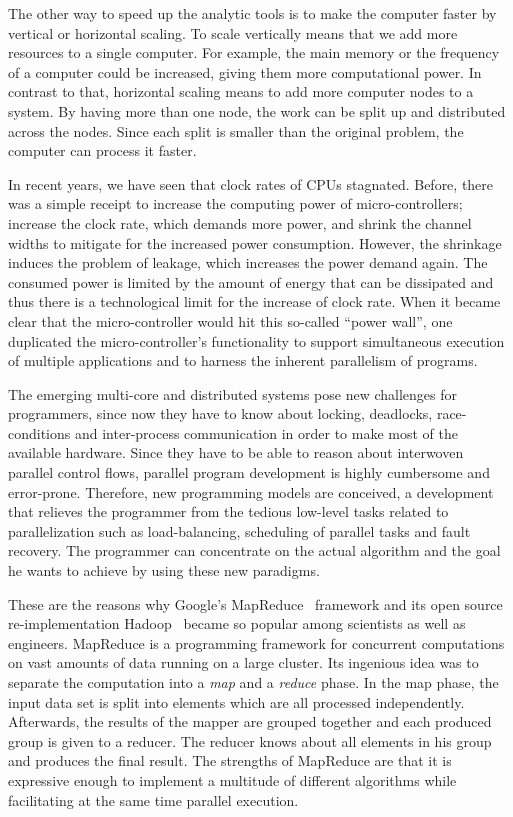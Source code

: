The other way to speed up the analytic tools is to make the computer faster by vertical or horizontal scaling.
To scale vertically means that we add more resources to a single computer.
For example, the main memory or the frequency of a computer could be increased, giving them more computational power.
In contrast to that, horizontal scaling means to add more computer nodes to a system.
By having more than one node, the work can be split up and distributed across the nodes.
Since each split is smaller than the original problem, the computer can process it faster.

In recent years, we have seen that clock rates of CPUs stagnated.
Before, there was a simple receipt to increase the computing power of micro-controllers; increase the clock rate, which demands more power, and shrink the channel widths to mitigate for the increased power consumption.
However, the shrinkage induces the problem of leakage, which increases the power demand again.
The consumed power is limited by the amount of energy that can be dissipated and thus there is a technological limit for the increase of clock rate.
When it became clear that the micro-controller would hit this so-called ``power wall'', one duplicated the micro-controller's functionality to support simultaneous execution of multiple applications and to harness the inherent parallelism of programs.

The emerging multi-core and distributed systems pose new challenges for programmers, since now they have to know about locking, deadlocks, race-conditions and inter-process communication in order to make most of the available hardware.
Since they have to be able to reason about interwoven parallel control flows, parallel program development is highly cumbersome and error-prone.
Therefore, new programming models are conceived, a development that relieves the programmer from the tedious low-level tasks related to parallelization such as load-balancing, scheduling of parallel tasks and fault recovery.
The programmer can concentrate on the actual algorithm and the goal he wants to achieve by using these new paradigms.

These are the reasons why Google's MapReduce~\cite{dean:c2008a} framework and its open source re-implementation Hadoop~\cite{hadoop:2008a} became so popular among scientists as well as engineers.
MapReduce is a programming framework for concurrent computations on vast amounts of data running on a large cluster.
Its ingenious idea was to separate the computation into a \emph{map} and a \emph{reduce} phase.
In the map phase, the input data set is split into elements which are all processed independently.
Afterwards, the results of the mapper are grouped together and each produced group is given to a reducer.
The reducer knows about all elements in his group and produces the final result.
The strengths of MapReduce are that it is expressive enough to implement a multitude of different algorithms while facilitating at the same time parallel execution.

